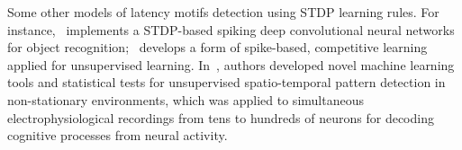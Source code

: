 \documentclass[brainsci, %
               review,submit,pdftex,moreauthors]{Definitions/mdpi}
\begin{document}
Some other models of latency motifs detection using STDP learning rules. For instance,~\citep{kheradpisheh_stdp-based_2018} implements a STDP-based spiking deep convolutional neural networks for object recognition;~\citep{tavanaei_representation_2018} develops a form of spike-based, competitive learning applied for unsupervised learning. In~\citep{russo_cell_2017}, authors developed novel machine learning tools and statistical tests for unsupervised spatio-temporal pattern detection in non-stationary environments, which was applied to simultaneous electrophysiological recordings from tens to hundreds of neurons for decoding cognitive processes from neural activity.

\end{document}
